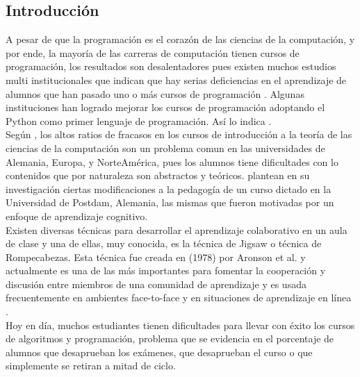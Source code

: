 \documentclass[twoside]{article}
\begin{document}
\begin{multicols}{2} %

\section{Introducción}

A pesar de que la programación es el corazón de las ciencias de la computación, y por ende, la mayoría de las carreras de computación tienen cursos de programación, los resultados son desalentadores pues existen muchos estudios multi institucionales que indican que hay serias deficiencias en el aprendizaje de alumnos que han pasado uno o más cursos de programación \cite{mccracken_multi-national_2001,lister_multi-national_2004,Tenenberg_studentsdesigning_2005}. Algunas instituciones han logrado mejorar los cursos de programación adoptando el Python como primer lenguaje de programación. Así lo indica .\\

Según , los altos ratios de fracasos en los cursos de introducción a la teoría de las ciencias de la computación son un problema comun en las universidades de Alemania, Europa, y NorteAmérica, pues los alumnos tiene dificultades con lo contenidos que por naturaleza son abstractos y teóricos. \cite{knobelsdorf_teaching_2014} plantean en su investigación ciertas modificaciones a la pedagogía de un curso dictado en la Universidad de Postdam, Alemania, las mismas que fueron motivadas por un enfoque de aprendizaje cognitivo.\\

Existen diversas técnicas para desarrollar el aprendizaje colaborativo en un aula de clase y una de ellas, muy conocida, es la técnica de Jigsaw o técnica de Rompecabezas. Esta técnica fue creada en (1978) por Aronson et al. y actualmente es una de las más importantes para fomentar la cooperación y discusión entre miembros de una comunidad de aprendizaje y es usada frecuentemente en ambientes face-to-face y en situaciones de aprendizaje en línea \cite{blocher_increasing_2005}.\\

Hoy en día, muchos estudiantes tienen dificultades para llevar con éxito los cursos de algoritmos y programación, problema que se evidencia en el porcentaje de alumnos que desaprueban los exámenes, que desaprueban el curso o que simplemente se retiran a mitad de ciclo.\\


\end{multicols}
\end{document}
